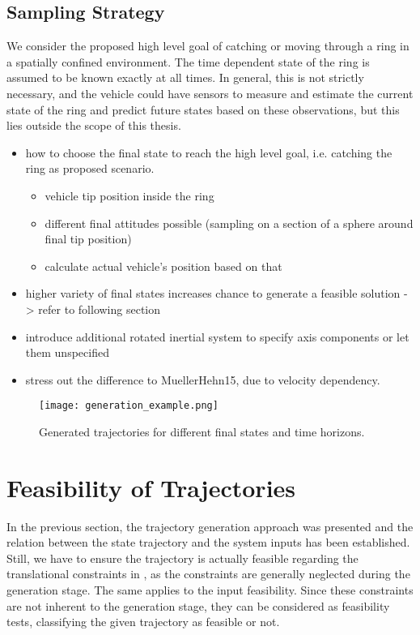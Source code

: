 \subsection{Sampling Strategy}
We consider the proposed high level goal of catching or moving through a ring in a spatially confined environment. The time dependent state of the ring is assumed to be known exactly at all times. In general, this is not strictly necessary, and the vehicle could have sensors to measure and estimate the current state of the ring and predict future states based on these observations, but this lies outside the scope of this thesis.


\begin{itemize}
	\color{red}
	\item how to choose the final state to reach the high level goal, i.e. catching the ring as proposed scenario.
	\begin{itemize}
		\item vehicle tip position inside the ring
		\item different final attitudes possible (sampling on a section of a sphere around final tip position)
		\item calculate actual vehicle's position based on that
	\end{itemize}
	\item higher variety of final states increases chance to generate a feasible solution -> refer to following section
	\item introduce additional rotated inertial system to specify axis components or let them unspecified
	\item stress out the difference to MuellerHehn15, due to velocity dependency.
\end{itemize}
\begin{figure}[h!]
	\centering
	\texttt{[image: generation\_example.png]}
	\caption{Generated trajectories for different final states and time horizons.}
\end{figure}
\section{Feasibility of Trajectories}
\label{sec:feasibility}
In the previous section, the trajectory generation approach was presented and the relation between the state trajectory and the system inputs has been established.
Still, we have to ensure the trajectory is actually feasible regarding the translational constraints in , as the constraints are generally neglected during the generation stage.
The same applies to the input feasibility.
Since these constraints are not inherent to the generation stage, they can be considered as feasibility tests, classifying the given trajectory as feasible or not. 

